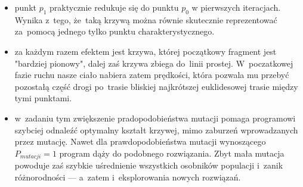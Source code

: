 \documentclass{classrep}
\begin{document}
\begin{itemize}
  \item punkt $p_1$ praktycznie redukuje się do punktu $p_0$ w pierwszych iteracjach. Wynika z~tego, że~taką krzywą można równie skutecznie reprezentować za~pomocą jednego tylko punktu charakterystycznego.
  \item za każdym razem efektem jest krzywa, której początkowy fragment jest "bardziej pionowy", dalej zaś krzywa zbiega do~linii prostej. W~poczatkowej fazie ruchu nasze ciało nabiera zatem prędkości, która pozwala mu przebyć pozostałą część drogi po~trasie bliskiej najkrótszej euklidesowej trasie między tymi punktami.
  \item w~zadaniu tym zwiększenie pradopodobieństwa mutacji pomaga programowi szybciej odnaleźć optymalny kształt krzywej, mimo zaburzeń wprowadzanych przez mutację. Nawet dla prawdopodobieństwa mutacji wynoszącego $P_{mutacji}=1$ program dąży do podobnego rozwiązania. Zbyt mała mutacja powoduje zaś szybkie uśrednienie wszystkich osobników populacji i~zanik różnorodności --- a~zatem i~eksplorowania nowych rozwiązań.
\end{itemize}
\end{document}
